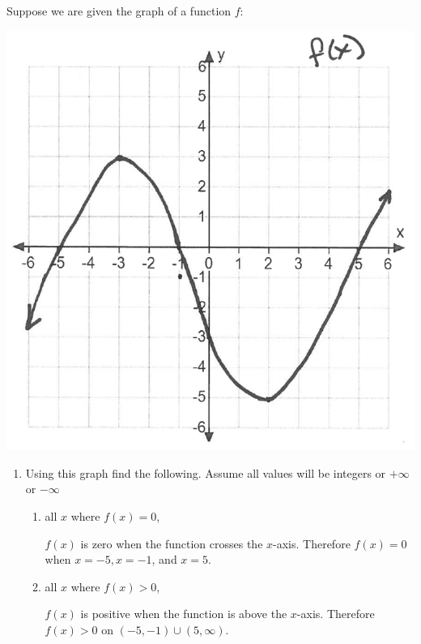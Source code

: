 \documentclass[nooutcomes]{ximera}
\begin{document}
\begin{problem}
  Suppose we are given the graph of a function $f$:
  \begin{image}
    \includegraphics[scale=.5]{Figure1.png}
  \end{image}
  \begin{enumerate}
    \item
      Using this graph find the following.  Assume all values will be integers or $+\infty$ or $-\infty$
      \begin{enumerate}
        \item 
          all $x$ where $f(x) = 0$,
          \begin{freeResponse}
            $f(x)$ is zero when the function crosses the $x$-axis.
            Therefore $f(x) = 0$ when $x = -5, x=-1$, and $x = 5$.
          \end{freeResponse}

        \item 
          all $x$ where $f(x) > 0$, 
          \begin{freeResponse}
            $f(x)$ is positive when the function is above the $x$-axis.
            Therefore $f(x) > 0$ on $(-5,-1) \cup (5,\infty)$. 
          \end{freeResponse}


\end{enumerate}
\end{enumerate}
\end{problem}
\end{document}
